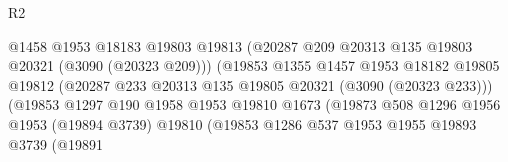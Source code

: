 \begin{lexlean}{R2}
\begin{coremodule}
                                            @1458
                                            @1953
                                            @18183
                                            @19803
                                            @19813
                                            (@20287
                                              @209
                                              @20313
                                              @135
                                              @19803
                                              @20321
                                              (@3090 (@20323 @209)))
                                            (@19853
                                              @1355
                                              @1457
                                              @1953
                                              @18182
                                              @19805
                                              @19812
                                              (@20287
                                                @233
                                                @20313
                                                @135
                                                @19805
                                                @20321
                                                (@3090 (@20323 @233)))
                                              (@19853
                                                @1297
                                                @190
                                                @1958
                                                @1953
                                                @19810
                                                @1673
                                                (@19873
                                                  @508
                                                  @1296
                                                  @1956
                                                  @1953
                                                  (@19894 @3739)
                                                  @19810
                                                  (@19853
                                                    @1286
                                                    @537
                                                    @1953
                                                    @1955
                                                    @19893
                                                    @3739
                                                    (@19891

\end{coremodule}
\end{lexlean}
